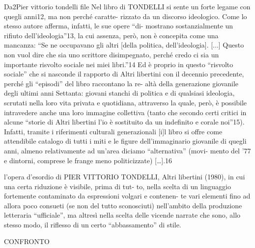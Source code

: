 Da2Pier vittorio tondelli file 
Nel libro di TONDELLI si sente un forte legame con quegli anni12, ma non perché caratte-
rizzato da un discorso ideologico. Come lo stesso autore afferma, infatti, le sue opere “di-
mostrano sostanzialmente un rifiuto dell’ideologia”13, la cui assenza, però, non è concepita
come una mancanza: “Se ne occupavano gli altri [della politica, dell’ideologia]. [...] Questo
non vuol dire che sia uno scrittore disimpegnato, perché credo ci sia un importante risvolto
sociale nei miei libri.”14 Ed è proprio in questo “risvolto sociale” che si nasconde il rapporto
di Altri libertini con il decennio precedente, perché gli “episodi” del libro raccontano la re-
altà della generazione giovanile degli ultimi anni Settanta: giovani stanchi di politica e di
qualsiasi ideologia, scrutati nella loro vita privata e quotidiana, attraverso la quale, però, è
possibile intravedere anche una loro immagine collettiva (tanto che secondo certi critici in
alcune “storie di Altri libertini l’io è sostituito da un indefinito e corale noi”15). Infatti, tramite
i riferimenti culturali generazionali [i]l libro si offre come attendibile catalogo di tutti i miti e le figure dell’immaginario
giovanile di quegli anni, almeno relativamente ad un’area diciamo “alternativa” (movi-
mento del ’77 e dintorni, comprese le frange meno politicizzate) […].16


l’opera d’esordio
di PIER VITTORIO TONDELLI, Altri libertini (1980), in cui una certa riduzione è visibile, prima di tut-
to, nella scelta di un linguaggio fortemente contaminato da espressioni volgari e contenen-
te vari elementi fino ad allora poco consueti (se non del tutto sconosciuti) nell’ambito della
produzione letteraria “ufficiale”, ma altresì nella scelta delle vicende narrate che sono, allo
stesso modo, il riflesso di un certo “abbassamento” di stile.




CONFRONTO
